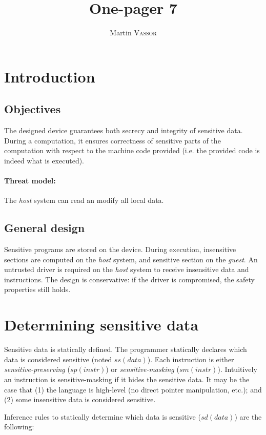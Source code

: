 \documentclass{article}
\title{One-pager 7}
\author{Martin \textsc{Vassor}}
\date{}
\begin{document}
\maketitle

\section{Introduction}
\subsection{Objectives}
The designed device guarantees both secrecy and integrity of sensitive data. During a computation, it ensures correctness of sensitive parts of the computation with respect to the machine code provided (i.e. the provided code is indeed what is executed).
\paragraph{Threat model:} The \emph{host} system can read an modify all local data.
\subsection{General design}
Sensitive programs are stored on the device. During execution, insensitive sections are computed on the \emph{host} system, and sensitive section on the \emph{guest}.
An untrusted driver is required on the \emph{host} system to receive insensitive data and instructions. The design is conservative: if the driver is compromised, the safety properties still holds. 

\section{Determining sensitive data}
Sensitive data is statically defined. The programmer statically declares which data is considered sensitive (noted $ss(data)$). Each instruction is either \emph{sensitive-preserving} ($sp(instr)$) or \emph{sensitive-masking} ($sm(instr)$). Intuitively an instruction is sensitive-masking if it hides the sensitive data. It may be the case that (1) the language is high-level (no direct pointer manipulation, etc.); and (2) some insensitive data is considered sensitive.

Inference rules to statically determine which data is sensitive ($sd(data)$) are the following: 

\begin{center}
	\mbox{
	}
\end{center}
\end{document}
